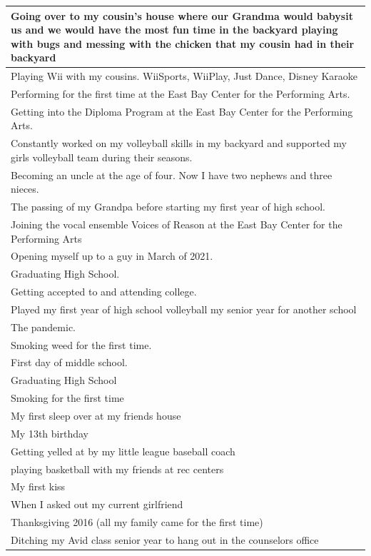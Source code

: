 \documentclass[
  .7em,
  letterpaper,
  DIV=11,
  numbers=noendperiod]{scrartcl}
\begin{document}
\begin{table}
\begin{tabular}{l}
Going over to my cousin's house where our Grandma would babysit us and we would have the most fun time in the backyard playing with bugs and messing with the chicken that my cousin had in their backyard\\
\hline
Playing Wii with my cousins. WiiSports, WiiPlay, Just Dance, Disney Karaoke\\
\hline
Performing for the first time at the East Bay Center for the Performing Arts.\\
\hline
Getting into the Diploma Program at the East Bay Center for the Performing Arts.\\
\hline
Constantly worked on my volleyball skills in my backyard and supported my girls volleyball team during their seasons.\\
\hline
Becoming an uncle at the age of four. Now I have two nephews and three nieces.\\
\hline
The passing of my Grandpa before starting my first year of high school.\\
\hline
Joining the vocal ensemble Voices of Reason at the East Bay Center for the Performing Arts\\
\hline
Opening myself up to a guy in March of 2021.\\
\hline
Graduating High School.\\
\hline
Getting accepted to and attending college.\\
\hline
Played my first year of high school volleyball my senior year for another school\\
\hline
The pandemic.\\
\hline
Smoking weed for the first time.\\
\hline
First day of middle school.\\
\hline
Graduating High School\\
\hline
Smoking for the first time\\
\hline
My first sleep over at my friends house\\
\hline
My 13th birthday\\
\hline
Getting yelled at by my little league baseball coach\\
\hline
playing basketball with my friends at rec centers\\
\hline
My first kiss\\
\hline
When I asked out my current girlfriend\\
\hline
Thanksgiving 2016 (all my family came for the first time)\\
\hline
Ditching my Avid class senior year to hang out in the counselors office\\

\end{tabular}
\end{table}
\end{document}
